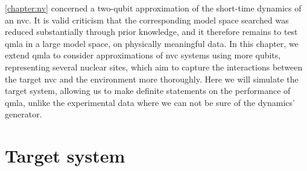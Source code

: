 \cref{chapter:nv} concerned a two-qubit approximation of the short-time dynamics of an \gls{nvc}. 
It is valid criticism that the corresponding \gls{model space} searched was reduced substantially through prior knowledge,
    and it therefore remains to test \gls{qmla} in a large model space, on physically meaningful data. 
In this chapter, we extend \gls{qmla} to consider approximations of \gls{nvc} systems using more qubits, 
    representing several nuclear sites, which aim to capture the interactions between the 
    target \gls{nvc} and the environment more thoroughly. 
Here we will simulate the target system, allowing us to make definite statements on the performance of \gls{qmla}, 
    unlike the experimental data where we can not be sure of the dynamics' generator.

\par 

\section{Target system}

